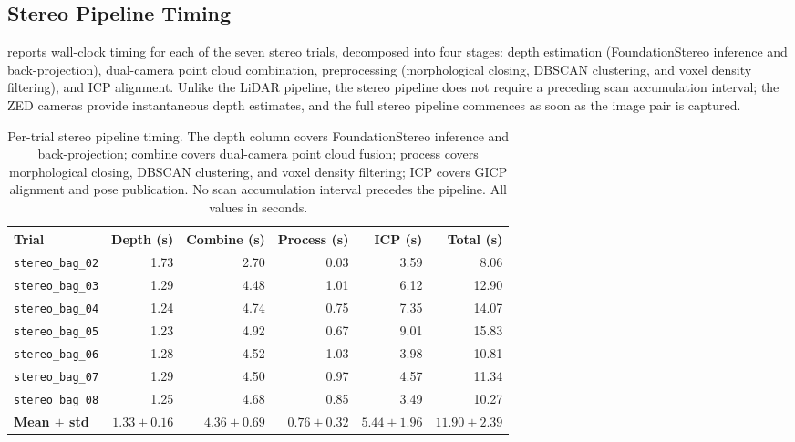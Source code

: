 \subsection{Stereo Pipeline Timing}
\label{subsec:pa-results-stereo-timing}

 reports wall-clock timing for each of the seven stereo trials, decomposed into four stages: depth estimation (FoundationStereo inference and back-projection), dual-camera point cloud combination, preprocessing (morphological closing, DBSCAN clustering, and voxel density filtering), and ICP alignment. Unlike the LiDAR pipeline, the stereo pipeline does not require a preceding scan accumulation interval; the ZED cameras provide instantaneous depth estimates, and the full stereo pipeline commences as soon as the image pair is captured.

\begin{table}[htbp]
  \centering
  \small
  \setlength{\tabcolsep}{4pt}
  \caption{Per-trial stereo pipeline timing. The depth column covers FoundationStereo inference and back-projection; combine covers dual-camera point cloud fusion; process covers morphological closing, DBSCAN clustering, and voxel density filtering; ICP covers GICP alignment and pose publication. No scan accumulation interval precedes the pipeline. All values in seconds.}
  \label{tab:pa-results-stereo-timing}
  \begin{tabular}{@{} l r r r r r @{}}
    \toprule
    \textbf{Trial} &
    \textbf{Depth (s)} &
    \textbf{Combine (s)} &
    \textbf{Process (s)} &
    \textbf{ICP (s)} &
    \textbf{Total (s)} \\
    \midrule
    \texttt{stereo\_bag\_02} & 1.73 & 2.70 & 0.03 & 3.59 &  8.06 \\
    \texttt{stereo\_bag\_03} & 1.29 & 4.48 & 1.01 & 6.12 & 12.90 \\
    \texttt{stereo\_bag\_04} & 1.24 & 4.74 & 0.75 & 7.35 & 14.07 \\
    \texttt{stereo\_bag\_05} & 1.23 & 4.92 & 0.67 & 9.01 & 15.83 \\
    \texttt{stereo\_bag\_06} & 1.28 & 4.52 & 1.03 & 3.98 & 10.81 \\
    \texttt{stereo\_bag\_07} & 1.29 & 4.50 & 0.97 & 4.57 & 11.34 \\
    \texttt{stereo\_bag\_08} & 1.25 & 4.68 & 0.85 & 3.49 & 10.27 \\
    \midrule
    \textbf{Mean $\pm$ std} & $1.33 \pm 0.16$ & $4.36 \pm 0.69$ & $0.76 \pm 0.32$ & $5.44 \pm 1.96$ & $11.90 \pm 2.39$ \\
    \bottomrule
  \end{tabular}
\end{table}

